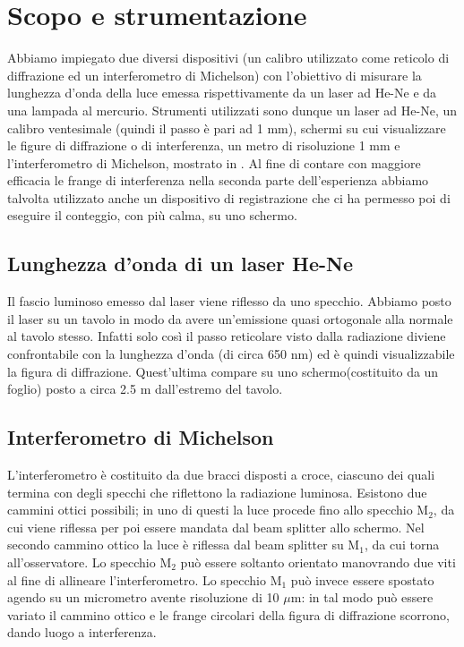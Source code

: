 \section{Scopo e strumentazione}

Abbiamo impiegato due diversi dispositivi (un calibro utilizzato come reticolo di diffrazione ed un interferometro di Michelson) con l'obiettivo di misurare la lunghezza d'onda della luce emessa rispettivamente da un laser ad He-Ne e da una lampada al mercurio. Strumenti utilizzati sono dunque un laser ad He-Ne, un calibro ventesimale (quindi il passo è pari ad 1 mm), schermi su cui visualizzare le figure di diffrazione o di interferenza, un metro di risoluzione 1 mm e l'interferometro di Michelson, mostrato in . Al fine di contare con maggiore efficacia le frange di interferenza nella seconda parte dell'esperienza abbiamo talvolta utilizzato anche un dispositivo di registrazione che ci ha permesso poi di eseguire il conteggio, con più calma, su uno schermo.\\
\subsection{Lunghezza d'onda di un laser He-Ne}
Il fascio luminoso emesso dal laser viene riflesso da uno specchio.
Abbiamo posto il laser su un tavolo in modo da avere un'emissione quasi ortogonale alla normale al tavolo stesso. Infatti solo così il passo reticolare visto dalla radiazione diviene confrontabile con la lunghezza d'onda (di circa 650 nm) ed è quindi visualizzabile la figura di diffrazione. Quest'ultima compare su uno schermo(costituito da un foglio) posto a circa 2.5 m dall'estremo del tavolo.\\
\subsection{Interferometro di Michelson}
L'interferometro è costituito da due bracci disposti a croce, ciascuno dei quali termina con degli specchi che riflettono la radiazione luminosa. Esistono due cammini ottici possibili; in uno di questi la luce procede fino allo specchio M$_2$, da cui viene riflessa per poi essere mandata dal beam splitter allo schermo. Nel secondo cammino ottico la luce è riflessa dal beam splitter su M$_1$, da cui torna all'osservatore. Lo specchio M$_2$ può essere soltanto orientato manovrando due viti al fine di allineare l'interferometro. Lo specchio M$_1$ può invece essere spostato agendo su un micrometro avente risoluzione di 10 $\mu$m: in tal modo può essere variato il cammino ottico e le frange circolari della figura di diffrazione scorrono, dando luogo a interferenza.

